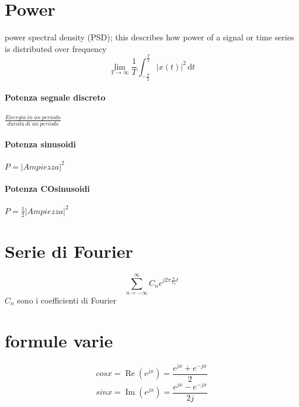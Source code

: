 \documentclass[12pt,a4paper,]{article}
\begin{document}
\section{Power}
power spectral density (PSD); this describes how power of a signal or time series is distributed over frequency
\begin{equation}
\lim_{T\to\infty} \frac{1}{T} \int_{-\frac{T}{2}}^{\frac{T}{2}} \! |x(t)|^{2}\, \mathrm{d}t 
\end{equation}
 \paragraph{Potenza segnale discreto}
 $\frac{Energia \: in \: un\:  periodo}{durata \: di \: un \: periodo}$
 \paragraph{Potenza sinusoidi}
 $P = |Ampiezza|^{2}$
  \paragraph{Potenza COsinusoidi}
 $P = \frac{1}{2} |Ampiezza|^2$
 \section{Serie di Fourier}
 \begin{equation}
 \sum_{n=-\infty}^{\infty}  C_{n} e^{j2\pi\frac{n}{T_{0}}t}
  \end{equation}
  $C_{n}$ sono i coefficienti di Fourier
  
 \section{formule varie}
 \begin{equation}
 cos x = \operatorname{Re} \left(e^{jx}\right) =\frac{e^{jx} + e^{-jx}}{2}
  \end{equation}
   \begin{equation}
sin x = \operatorname{Im} \left(e^{jx}\right) =\frac{e^{jx} - e^{-jx}}{2j}
 \end{equation}
 
 
 
\end{document}
